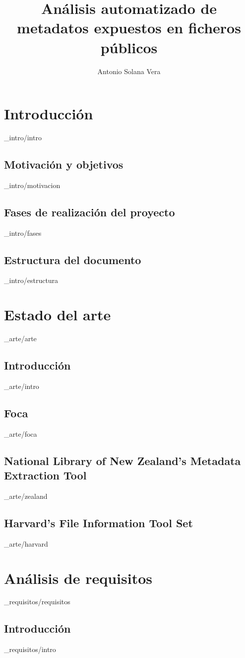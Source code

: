 \documentclass[epsbased,copyright,final,printable,covers,extendedindex,firstnumbered,tfg,gnuplot]{tfgtfmthesisuam}
\title{Análisis automatizado de metadatos expuestos en ficheros públicos}
\author{Antonio Solana Vera}
\begin{document}
\chapter{Introducci\'on\label{CAP:ESTETICA}}{_intro/intro}
  \section{Motivaci\'on y objetivos\label{SEC:TIPODOC}}{_intro/motivacion}
  \section{Fases de realizaci\'on del proyecto\label{SEC:COLORES}}{_intro/fases}
  \section{Estructura del documento\label{SEC:USOCOLORES}}{_intro/estructura}

\chapter{Estado del arte\label{CAP:ESTRUCTURA}}{_arte/arte}
  \section{Introducci\'on\label{SEC:VARIABLES}}{_arte/intro}
  \section{Foca\label{SEC:INDICES}}{_arte/foca}
  \section{National Library of New Zealand's Metadata Extraction Tool\label{SEC:INDICES}}{_arte/zealand}
  \section{Harvard's File Information Tool Set\label{SEC:INDICES}}{_arte/harvard}

\chapter{An\'alisis de requisitos\label{CAP:PRIMEROSPASOS}}{_requisitos/requisitos}
  \section{Introducci\'on\label{SEC:ESTRUCTURAR}}{_requisitos/intro}
\end{document}
